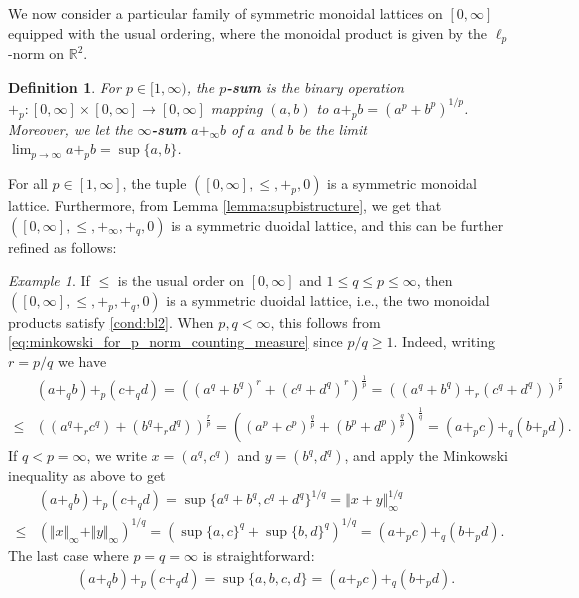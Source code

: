 \documentclass[a4paper,11pt]{article}
\newcounter{dummy}\numberwithin{dummy}{section}
\newtheorem{definition}[dummy]{Definition}
\theoremstyle{remark}
\newtheorem{example}[dummy]{Example}
\begin{document}
We now consider a particular family of symmetric monoidal lattices on $[0,\infty]$ equipped with the usual ordering, where the monoidal product is given by the $\ell_p$-norm on $\mathbb{R}^2$.
\begin{definition}\label{def:p_sum}
For $p\in[1,\infty)$, the \textbf{$p$-sum} is the binary operation $+_p\colon [0,\infty]\times[0,\infty] \to[0,\infty]$ mapping $(a,b)$ to $a+_p b = (a^p+b^p)^{1/p}$. Moreover, we let the \textbf{$\infty$-sum} $a+_\infty b$ of $a$ and $b$ be the limit $\lim_{p\to\infty}a +_p b = \sup\{a,b\}$.
\end{definition}

For all $p\in[1,\infty]$, the tuple  $([0,\infty], \leq, +_p, 0)$ is a symmetric monoidal lattice. Furthermore, from Lemma \ref{lemma:supbistructure}, we get that $([0,\infty], \leq, +_\infty, +_q, 0)$ is a symmetric duoidal lattice, and this can be further refined as follows:

\begin{example}\label{ex:p_q_sum_bistructure}
If $\leq$ is the usual order on $[0,\infty]$ and $1\leq q\leq p \leq \infty$, then $([0,\infty], \leq, +_p, +_q, 0)$ is a symmetric duoidal lattice, i.e., the two monoidal products satisfy \ref{cond:bl2}. When $p,q<\infty$, this follows from \cref{eq:minkowski_for_p_norm_counting_measure} since $p/q\geq1$. Indeed, writing $r=p/q$ we have
\begin{align*}
    &(a+_q b)+_p(c+_q d)=\left((a^q+b^q)^{r}+(c^q+d^q)^{r}\right)^\frac{1}{p}=\left((a^q+b^q)+_r(c^q+d^q)\right)^\frac{r}{p}\\
    \leq&\left((a^q+_r c^q)+(b^q+_r d^q)\right)^\frac{r}{p}=\left((a^p+c^p)^\frac{q}{p}+(b^p+d^p)^\frac{q}{p}\right)^\frac{1}{q}=(a+_p c)+_q(b+_p d).
\end{align*}
If $q<p=\infty$, we write $x=(a^q, c^q)$ and $y=(b^q,d^q)$, and apply the Minkowski inequality as above to get
\begin{align*}
&(a+_q b)+_p(c+_q d)=\sup\{a^q+b^q, c^q+d^q\}^{1/q}=\Vert x+y\Vert_\infty^{1/q}\\\leq&\left(\Vert x\Vert_\infty+\Vert y\Vert_\infty\right)^{1/q}=\left(\sup\{a, c\}^q+\sup\{b, d\}^q\right)^{1/q}=(a+_p c)+_q(b+_p d).
\end{align*}
The last case where $p=q=\infty$ is straightforward:
\begin{align*}
&(a+_q b)+_p(c+_q d)=\sup\{a,b,c,d\}=(a+_p c)+_q(b+_p d).
\end{align*}
\end{example}
\end{document}
